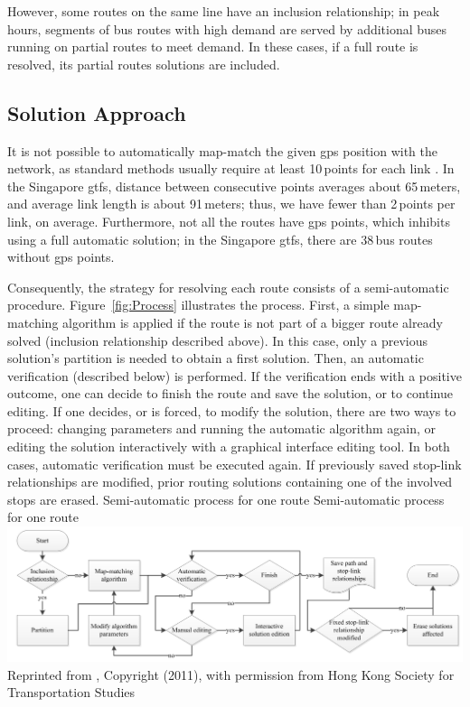 However, some routes on the same line have an inclusion relationship; in peak hours, segments of bus routes with high demand are served by additional buses running on partial routes to meet demand. In these cases, if a full route is resolved, its partial routes solutions are included.

\subsection{Solution Approach}
It is not possible to automatically map-match the given \gls{gps} position with the network, as standard methods usually require at least 10\,points for each link \citep[][]{SchuesslerAxhausen_TechRep_IVT_2009}. In the Singapore \gls{gtfs}, distance between consecutive points averages about 65\,meters, and average link length is about 91\,meters; thus, we have fewer than 2\,points per link, on average. Furthermore, not all the routes have \gls{gps} points, which inhibits using a full automatic solution; in the Singapore \gls{gtfs}, there are 38\,bus routes without \gls{gps} points.

Consequently, the strategy for resolving each route consists of a semi-automatic procedure. Figure~\ref{fig:Process} illustrates the process. First, a simple map-matching algorithm is applied if the route is not part of a bigger route already solved (inclusion relationship described above). In this case, only a previous solution's partition is needed to obtain a first solution. Then, an automatic verification (described below) is performed. If the verification ends with a positive outcome, one can decide to finish the route and save the solution, or to continue editing. If one decides, or is forced, to modify the solution, there are two ways to proceed: changing parameters and running the automatic algorithm again, or editing the solution interactively with a graphical interface editing tool. In both cases, automatic verification must be executed again. If previously saved stop-link relationships are modified, prior routing solutions containing one of the involved stops are erased.
%
\createfigure
{Semi-automatic process for one route}
{Semi-automatic process for one route}
{\label{fig:Process}}
{\includegraphics[width=1.0\textwidth]{extending/figures/semiAuto/Process.png}}
{Reprinted from \citet[][p.754]{Ordonez_HKSTS_2011}, Copyright (2011), with permission from Hong Kong Society for Transportation Studies}

